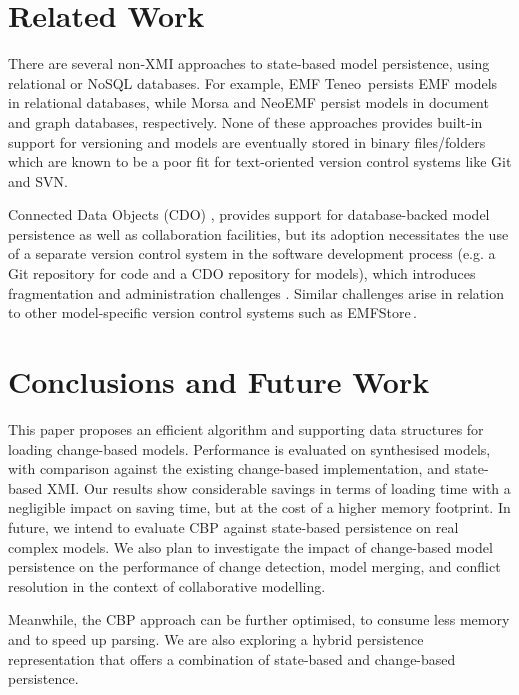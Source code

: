 \documentclass{llncs}
\begin{document}
    \section{Related Work}
    \label{sec:related_work}
    
    There are several non-XMI approaches to  state-based model persistence, using relational or NoSQL databases. For example, EMF Teneo\,\cite{eclipse2017teneo} persists EMF models in relational databases, while Morsa \cite{pagan2011morsa} and NeoEMF \cite{daniel2016neoemf} persist models in document and graph databases, respectively.  None of these approaches provides built-in support for versioning and models are eventually stored in binary files/folders which are known to be a poor fit for text-oriented version control systems like Git and SVN.
    
    Connected Data Objects (CDO) \cite{eclipse2017cdo}, provides support for database-backed model persistence as well as collaboration facilities, but its adoption necessitates the use of a separate version control system in the software development process (e.g. a Git repository for code and a CDO repository for models), which introduces fragmentation and administration challenges \cite{barmpis2014evaluation}. Similar challenges arise in relation to other model-specific version control systems such as EMFStore\,\cite{koegel2010emfstore}.
    
    \section{Conclusions and Future Work}
    \label{sec:conclusions}
    This paper proposes an efficient algorithm and supporting data structures for loading change-based models.  Performance is evaluated on synthesised models, with comparison against the existing change-based implementation, and state-based XMI. 
    Our results show considerable savings in terms of loading time with a negligible impact on saving time, but at the cost of a higher memory footprint.  In future, we intend to evaluate CBP against state-based persistence on real complex models.  We also plan to investigate the impact of change-based model persistence on the performance of change detection, model merging, and conflict resolution in the context of collaborative modelling.
    
    Meanwhile, the CBP approach can be further optimised, to consume less memory and to speed up parsing.  We are also exploring a hybrid persistence representation that offers a combination of state-based and change-based persistence. 
    
\end{document}
